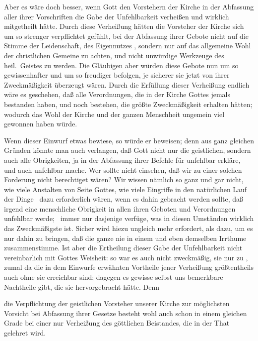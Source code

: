 \begin{aufza}
\begin{aufzb}
 Aber es wäre doch besser, wenn Gott den Vorstehern der Kirche in der Abfassung aller ihrer Vorschriften die Gabe der Unfehlbarkeit verheißen und wirklich mitgetheilt hätte. Durch diese Verheißung hätten die Vorsteher der Kirche sich um so strenger verpflichtet gefühlt, bei der Abfassung ihrer Gebote nicht auf die Stimme der Leidenschaft, des Eigennutzes \udgl , sondern nur auf das allgemeine Wohl der christlichen Gemeine zu achten, und nicht unwürdige Werkzeuge des heil.\ Geistes zu werden. Die Gläubigen aber würden diese Gebote nun um so gewissenhafter und um so freudiger befolgen, je sicherer sie jetzt von ihrer Zweckmäßigkeit überzeugt wären. Durch die Erfüllung dieser Verheißung endlich wäre es geschehen, daß alle Verordnungen, die in der Kirche Gottes jemals bestanden haben, und noch bestehen, die größte Zweckmäßigkeit erhalten hätten; wodurch das Wohl der Kirche und der ganzen Menschheit ungemein viel gewonnen haben würde.\par
{} Wenn dieser Einwurf etwas bewiese, so würde er  beweisen; denn aus ganz gleichen Gründen könnte man auch verlangen, daß Gott nicht nur die geistlichen, sondern auch alle  Obrigkeiten, ja  in der Abfassung ihrer Befehle für unfehlbar erkläre, und auch unfehlbar mache. Wer sollte nicht einsehen, daß wir zu einer solchen Forderung nicht berechtiget wären? Wir wissen nämlich so ganz und gar nicht, wie viele Anstalten von Seite Gottes, wie viele Eingriffe in den natürlichen Lauf der Dinge \usw\ dazu erforderlich wären, wenn es dahin gebracht werden sollte, daß irgend eine menschliche Obrigkeit in allen ihren Geboten und Verordnungen unfehlbar werde; \dh\ immer nur dasjenige verfüge, was in diesen Umständen wirklich das Zweckmäßigste ist. Sicher wird hiezu ungleich mehr erfordert, als dazu, um es nur dahin zu bringen, daß die ganze  nie in einem und eben demselben Irrthume zusammenstimme. Ist aber die Ertheilung dieser Gabe der Unfehlbarkeit nicht vereinbarlich mit Gottes Weisheit: so war es auch nicht zweckmäßig, sie nur zu , zumal da die in dem Einwurfe erwähnten Vortheile jener Verheißung größtentheils auch ohne sie erreichbar sind; dagegen es gewisse selbst uns bemerkbare Nachtheile gibt, die sie hervorgebracht hätte. Denn 
\begin{aufzc}
\item die Verpflichtung der geistlichen Vorsteher unserer Kirche zur möglichsten Vorsicht bei Abfassung ihrer Gesetze besteht wohl auch schon in einem gleichen Grade bei einer nur  Verheißung des göttlichen Beistandes, die in der That gelehret wird.

\end{aufzc}
\end{aufzb}
\end{aufza}
